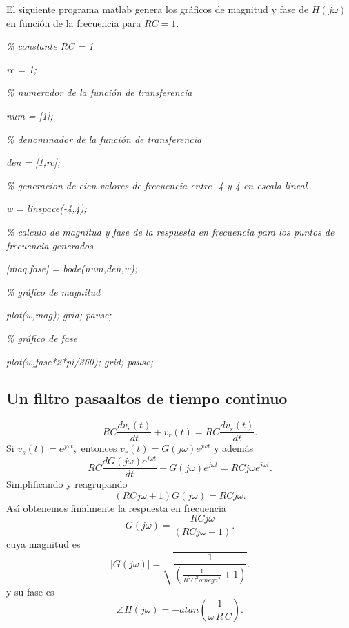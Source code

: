 El siguiente programa matlab genera los gr\'{a}ficos de magnitud y fase de 
$H\left( j\omega \right) $ en funci\'{o}n de la frecuencia para $RC=1$.

\textit{\% constante RC = 1}

\textit{rc = 1;}

\textit{\% numerador de la funci\'{o}n de transferencia}

\textit{num = [1];}

\textit{\% denominador de la funci\'{o}n de transferencia}

\textit{den = [1,rc];}

\textit{\% generacion de cien valores de frecuencia entre -4 y 4 en escala
lineal}

\textit{w = linspace(-4,4);}

\textit{\% calculo de magnitud y fase de la respuesta en frecuencia para los
puntos de frecuencia generados}

\textit{[mag,fase] = bode(num,den,w);}

\textit{\% gr\'{a}fico de magnitud}

\textit{plot(w,mag); grid; pause;}

\textit{\% gr\'{a}fico de fase}

\textit{plot(w,fase*2*pi/360); grid; pause;}

\subsection{Un filtro pasaaltos de tiempo continuo}

\begin{equation}
        RC\frac{dv_{r}\left( t\right) }{dt}+v_{r}\left( t\right) =RC\frac{dv_{s}\left( t\right) }{dt}.
\end{equation}
Si $v_{s}\left( t\right) =e^{j\omega t},$ entonces 
$v_{r}\left( t\right)=G\left( j\omega \right) e^{j\omega t}$ y adem\'{a}s 
\begin{equation}
RC\frac{dG\left( j\omega \right) e^{j\omega t}}{dt}+
G\left( j\omega \right)e^{j\omega t}=RCj\omega e^{j\omega t}.
\end{equation}
Simplificando y reagrupando 
\begin{equation}
 \left( RCj\omega +1\right) G\left( j\omega \right) = R C j\omega .
\end{equation}
As\'{\i} obtenemos finalmente la respuesta en frecuencia 
\begin{equation}
  G\left( j\omega \right) =\frac{RCj\omega }{\left( RCj\omega +1\right) }.
\end{equation}
cuya magnitud es
\begin{equation}
| G\left( j\omega \right) | = \sqrt{\frac{1}{\left( \frac{1}{R^{2} C^{2} omega^{2}} +1\right)}}.
\end{equation}
y su fase es
\begin{equation}
\angle H\left(j \omega \right) = -atan(\frac{1}{\omega \, R \, C}).
\end{equation}

